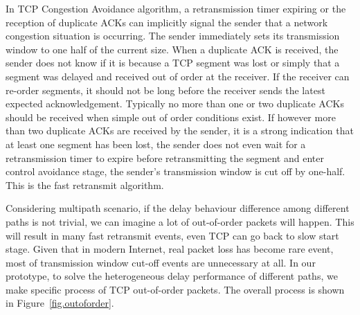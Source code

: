 In TCP Congestion Avoidance algorithm, a retransmission timer expiring or the reception of duplicate ACKs can implicitly signal the sender that a network congestion situation is occurring. The sender immediately sets its transmission window to one half of the current size. When a duplicate ACK is received, the sender does not know if it is because a TCP segment was lost or simply that a segment was delayed and received out of order at the receiver. If the receiver can re-order segments, it should not be long before the receiver sends the latest expected acknowledgement. Typically no more than one or two duplicate ACKs should be received when simple out of order conditions exist. If however more than two duplicate ACKs are received by the sender, it is a strong indication that at least one segment has been lost, the sender does not even wait for a retransmission timer to expire before retransmitting the segment and enter control avoidance stage, the sender's transmission window is cut off by one-half. This is the fast retransmit algorithm.


Considering multipath scenario, if the delay behaviour difference among different paths is not trivial, we can imagine a lot of out-of-order packets will happen. This will result in many fast retransmit events, even TCP can go back to slow start stage. Given that in modern Internet, real packet loss has become rare event, most of transmission window cut-off events are unnecessary at all. In our prototype, to solve the heterogeneous delay performance of different paths, we make specific process of TCP out-of-order packets. The overall process is shown in Figure~\ref{fig.outoforder}.

